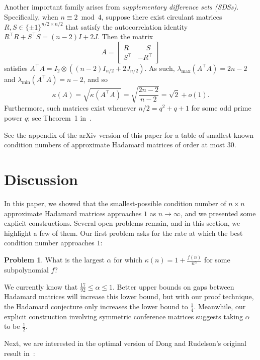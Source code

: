 \documentclass[11pt]{article}
\theoremstyle{plain}
\theoremstyle{definition}
\newtheorem{problem}[theorem]{Problem}
\begin{document}
Another important family arises from \textit{supplementary difference sets (SDSs)}.
Specifically, when $n\equiv 2\bmod 4$, suppose there exist circulant matrices $R,S\in\{\pm1\}^{n/2\times n/2}$ that satisfy the autocorrelation identity $R^\top R+S^\top S=(n-2)I+2J$.
Then the matrix
\[
A=\left[\begin{array}{ll} R & \phantom{-}S \\ S^\top & -R^\top\!\!\end{array}\right]
\]
satisfies $A^\top A=I_2\otimes((n-2)I_{n/2}+2J_{n/2})$.
As such, $\lambda_{\max}(A^\top A)=2n-2$ and $\lambda_{\min}(A^\top A)=n-2$, and so
\[
\kappa(A)
=\sqrt{\kappa(A^\top A)}
=\sqrt{\frac{2n-2}{n-2}}=\sqrt{2}+o(1).
\]
Furthermore, such matrices exist whenever $n/2=q^2+q+1$ for some odd prime power $q$; see Theorem~1 in~\cite{Spence:75}.

See the appendix of the arXiv version of this paper for a table of smallest known condition numbers of approximate Hadamard matrices of order at most $30$.







\section{Discussion}
\label{sec.discussion}

In this paper, we showed that the smallest-possible condition number of $n\times n$ approximate Hadamard matrices approaches $1$ as $n\to\infty$, and we presented some explicit constructions.
Several open problems remain, and in this section, we highlight a few of them.
Our first problem asks for the rate at which the best condition number approaches $1$:

\begin{problem}
What is the largest $\alpha$ for which $\displaystyle\kappa(n)=1+\frac{f(n)}{n^{\alpha}}$ for some subpolynomial $f$?
\end{problem}

We currently know that $\frac{17}{92}\leq\alpha\leq1$.
Better upper bounds on gaps between Hadamard matrices will increase this lower bound, but with our proof technique, the Hadamard conjecture only increases the lower bound to $\frac{1}{4}$.
Meanwhile, our explicit construction involving symmetric conference matrices suggests taking $\alpha$ to be $\frac{1}{2}$.

Next, we are interested in the optimal version of Dong and Rudelson's original result in~\cite{DongR:24}:
\end{document}
